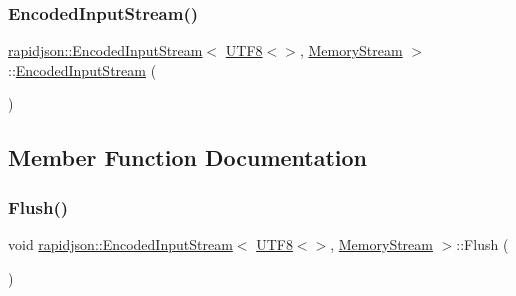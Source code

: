 \subsubsection{\texorpdfstring{EncodedInputStream()}{EncodedInputStream()}\hspace{0.1cm}{\footnotesize\ttfamily [2/2]}}
{\footnotesize\ttfamily \mbox{\hyperlink{classrapidjson_1_1_encoded_input_stream}{rapidjson\+::\+Encoded\+Input\+Stream}}$<$ \mbox{\hyperlink{structrapidjson_1_1_u_t_f8}{U\+T\+F8}}$<$$>$, \mbox{\hyperlink{structrapidjson_1_1_memory_stream}{Memory\+Stream}} $>$\+::\mbox{\hyperlink{classrapidjson_1_1_encoded_input_stream}{Encoded\+Input\+Stream}} (\begin{DoxyParamCaption}\item[{const \mbox{\hyperlink{classrapidjson_1_1_encoded_input_stream}{Encoded\+Input\+Stream}}$<$ \mbox{\hyperlink{structrapidjson_1_1_u_t_f8}{U\+T\+F8}}$<$$>$, \mbox{\hyperlink{structrapidjson_1_1_memory_stream}{Memory\+Stream}} $>$ \&}]{ }\end{DoxyParamCaption})\hspace{0.3cm}{\ttfamily [private]}}



\subsection{Member Function Documentation}
\mbox{\label{classrapidjson_1_1_encoded_input_stream_3_01_u_t_f8_3_4_00_01_memory_stream_01_4_a87daa0b45556f4e475f39754ba14815a}} 
\subsubsection{\texorpdfstring{Flush()}{Flush()}}
{\footnotesize\ttfamily void \mbox{\hyperlink{classrapidjson_1_1_encoded_input_stream}{rapidjson\+::\+Encoded\+Input\+Stream}}$<$ \mbox{\hyperlink{structrapidjson_1_1_u_t_f8}{U\+T\+F8}}$<$$>$, \mbox{\hyperlink{structrapidjson_1_1_memory_stream}{Memory\+Stream}} $>$\+::Flush (\begin{DoxyParamCaption}{ }\end{DoxyParamCaption})}



